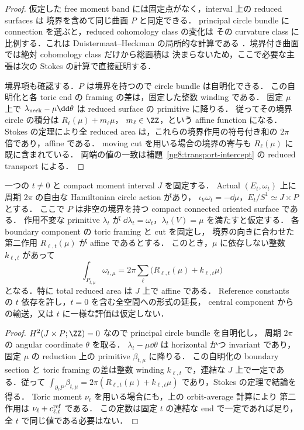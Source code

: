 \begin{proof}
仮定した free moment band には固定点がなく，interval 上の reduced surfaces は
境界を含めて同じ曲面 $P$ と同定できる．
principal circle bundle に connection を選ぶと，reduced cohomology class の変化は
その curvature class に比例する．これは Duistermaat--Heckman の局所的な計算である
\cite[Chapter~10]{DHJH}．境界付き曲面では絶対 cohomology class だけから総面積は
決まらないため，ここで必要な主張は次の Stokes の計算で直接証明する．

境界項も確認する．$P$ は境界を持つので circle bundle は自明化できる．
この自明化と各 toric end の framing の差は，固定した整数 winding である．
固定 $\mu$ 上で $\lambda_{\rm neck}-\mu\dd\theta$ は reduced surface の primitive に降りる．
従ってその境界 circle の積分は $R_\ell(\mu)+m_\ell\mu$，
$m_\ell\in\ZZ$，という affine function になる．
Stokes の定理により全 reduced area は，これらの境界作用の符号付き和の
$2\pi$ 倍であり，affine である．
moving cut を用いる場合の境界の寄与も $R_\ell(\mu)$ に既に含まれている．
両端の値の一致は補題~\ref{ng8:transport-intercept} の reduced transport による．
\end{proof}

\begin{lemma}
\label{ng8:fixed-fiber-relative-dh}
一つの $t\ne0$ と compact moment interval $J$ を固定する．
Actual $(E_t,\omega_t)$ 上に周期 $2\pi$ の自由な Hamiltonian circle action があり，
$\iota_V\omega_t=-\dd\mu$，$E_t/S^1\simeq J\times P$ とする．
ここで $P$ は非空の境界を持つ compact connected oriented surface である．
作用不変な primitive $\lambda_t$ が
$\dd\lambda_t=\omega_t$，$\lambda_t(V)=\mu$ を満たすと仮定する．
各 boundary component の toric framing と cut を固定し，
境界の向きに合わせた第二作用 $R_{\ell,t}(\mu)$ が affine であるとする．
このとき，$\mu$ に依存しない整数 $k_{\ell,t}$ があって
\begin{equation}\label{ng8:eq:fixed-fiber-area}
 \int_{P_{t,\mu}}\omega_{t,\mu}
 =2\pi\sum_\ell\bigl(R_{\ell,t}(\mu)+k_{\ell,t}\mu\bigr)
\end{equation}
となる．特に total reduced area は $J$ 上で affine である．
Reference constants の $t$ 依存を許し，$t=0$ を含む全空間への形式の延長，
central component からの輸送，又は $t$ に一様な評価は仮定しない．
\end{lemma}
\begin{proof}
$H^2(J\times P;\ZZ)=0$ なので principal circle bundle を自明化し，
周期 $2\pi$ の angular coordinate $\theta$ を取る．
$\lambda_t-\mu\dd\theta$ は horizontal かつ invariant であり，
固定 $\mu$ の reduction 上の primitive $\beta_{t,\mu}$ に降りる．
この自明化の boundary section と toric framing の差は整数 winding
$k_{\ell,t}$ で，連結な $J$ 上で一定である．従って
$\int_{\partial_\ell P}\beta_{t,\mu}
=2\pi(R_{\ell,t}(\mu)+k_{\ell,t}\mu)$ であり，Stokes の定理で結論を得る．
Toric moment $\nu_\ell$ を用いる場合にも，上の orbit-average 計算により
第二作用は $\nu_\ell+c_{\ell,t}^{\rm ref}$ である．
この定数は固定 $t$ の連結な end で一定であれば足り，全 $t$ で同じ値である必要はない．
\end{proof}

